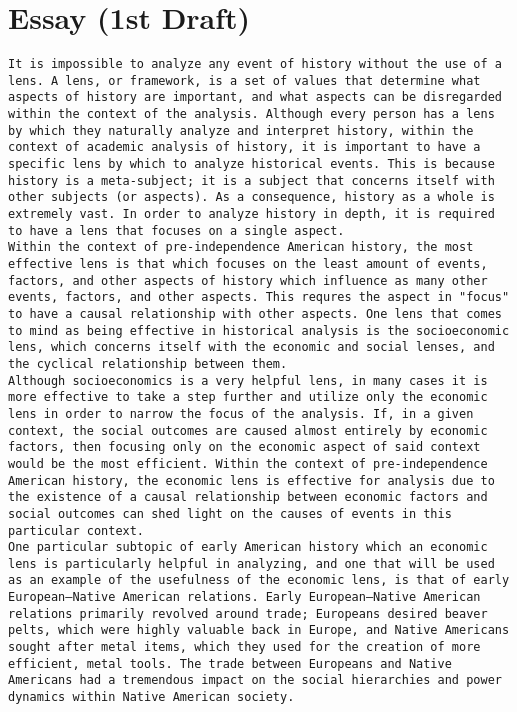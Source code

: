 \documentclass[letterpaper]{article}
\begin{document}
\section{Essay (1st Draft)}
\label{sec:orgcda44a5}
\begin{verbatim}
It is impossible to analyze any event of history without the use of a lens. A lens, or framework, is a set of values that determine what aspects of history are important, and what aspects can be disregarded within the context of the analysis. Although every person has a lens by which they naturally analyze and interpret history, within the context of academic analysis of history, it is important to have a specific lens by which to analyze historical events. This is because history is a meta-subject; it is a subject that concerns itself with other subjects (or aspects). As a consequence, history as a whole is extremely vast. In order to analyze history in depth, it is required to have a lens that focuses on a single aspect.
Within the context of pre-independence American history, the most effective lens is that which focuses on the least amount of events, factors, and other aspects of history which influence as many other events, factors, and other aspects. This requres the aspect in "focus" to have a causal relationship with other aspects. One lens that comes to mind as being effective in historical analysis is the socioeconomic lens, which concerns itself with the economic and social lenses, and the cyclical relationship between them. 
Although socioeconomics is a very helpful lens, in many cases it is more effective to take a step further and utilize only the economic lens in order to narrow the focus of the analysis. If, in a given context, the social outcomes are caused almost entirely by economic factors, then focusing only on the economic aspect of said context would be the most efficient. Within the context of pre-independence American history, the economic lens is effective for analysis due to the existence of a causal relationship between economic factors and social outcomes can shed light on the causes of events in this particular context.
One particular subtopic of early American history which an economic lens is particularly helpful in analyzing, and one that will be used as an example of the usefulness of the economic lens, is that of early European–Native American relations. Early European–Native American relations primarily revolved around trade; Europeans desired beaver pelts, which were highly valuable back in Europe, and Native Americans sought after metal items, which they used for the creation of more efficient, metal tools. The trade between Europeans and Native Americans had a tremendous impact on the social hierarchies and power dynamics within Native American society.

\end{verbatim}
\end{document}
